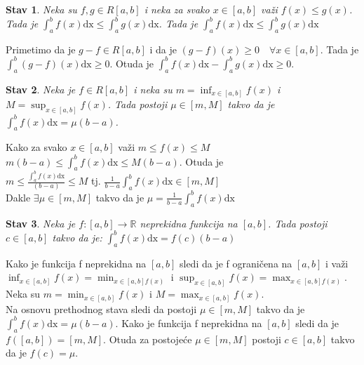 \documentclass{article}
\newtheorem{stav}{Stav}[section]
\begin{document}
\begin{stavbox}
    \begin{stav}
        Neka su $f, g \in R[a,b]$ i neka za svako $x \in [a, b]$ važi $f(x) \leq g(x)$. Tada je $\displaystyle \int^b_a f(x) \text{dx} \leq \int^b_a g(x)\text{dx}$. Tada je $\displaystyle \int^b_a f(x)\text{dx} \leq \int^b_a g(x)\text{dx}$
    \end{stav}
\end{stavbox}
Primetimo da je $g-f \in R[a, b]$ i da je $(g-f)(x) \geq 0\quad\forall x\in[a,b]$. Tada je $\displaystyle \int^b_a (g-f)(x)\text{dx} \geq 0$. Otuda je $\displaystyle \int^b_a f(x)\text{dx} - \int^b_a g(x)\text{dx} \geq 0$.
\begin{stavbox}
    \begin{stav}
        Neka je $f \in R[a, b]$ i neka su $\displaystyle m = \inf_{x\in [a, b]} f(x)$ i $\displaystyle M = \sup_{x \in [a,b]} f(x)$. Tada postoji $\mu \in [m, M]$ takvo da je $\displaystyle \int^b_a f(x) \text{dx} = \mu(b-a)$.
    \end{stav}
\end{stavbox}
Kako za svako $x \in [a, b]$ važi $m \leq f(x) \leq M$\\
$m(b-a) \leq \displaystyle\int^b_a f(x)\text{dx} \leq M(b-a)$. Otuda je\\
$m \leq \displaystyle \frac{\int^b_a f(x)\text{dx}}{(b-a)} \leq M$ tj. $\displaystyle \frac{1}{b-a}\int^b_a f(x)\text{dx} \in [m, M]$\\
Dakle $\exists\mu\in[m, M]$ takvo da je $\displaystyle \mu=\frac{1}{b-a}\int^b_a f(x)\text{dx}$
\begin{stavbox}
    \begin{stav}
        Neka je $f: [a, b] \rightarrow \mathbb{R}$ neprekidna funkcija na $[a, b]$. Tada postoji $c\in [a,b]$ takvo da je: $\displaystyle \int^b_a f(x)\text{dx} = f(c)(b-a)$
    \end{stav}
\end{stavbox}
Kako je funkcija f neprekidna na $[a, b]$ sledi da je f ograničena na $[a, b]$ i važi $\displaystyle \inf_{x\in[a,b]} f(x) = \min_{x \in [a, b] f(x)}$ i $\displaystyle \sup_{x\in[a,b]} f(x) = \max_{x \in [a, b] f(x)}$. Neka su $\displaystyle m = \min_{x\in[a,b]} f(x)$ i  $\displaystyle M = \max_{x\in[a,b]} f(x)$.\\
Na osnovu prethodnog stava sledi da postoji $\mu \in [m, M]$ takvo da je $\displaystyle \int^b_a f(x) \text{dx} = \mu (b-a)$. Kako je funkcija f neprekidna na $[a, b]$ sledi da je $f([a,b]) = [m, M]$. Otuda za postojeće $\mu \in [m, M]$ postoji $c \in [a, b]$ takvo da je $f(c) = \mu$.
\end{document}
